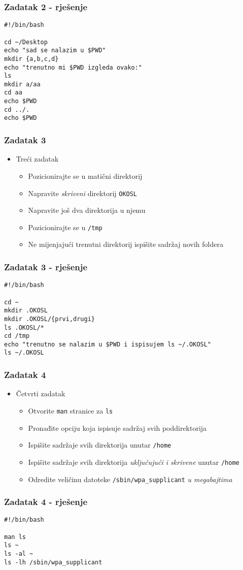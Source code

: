 \documentclass{beamer}
\newcommand{\shell}[1]{\texttt{#1}}
\begin{document}
\begin{frame}[fragile]
\frametitle{Zadatak 2 - rješenje}
    \begin{verbatim}
#!/bin/bash

cd ~/Desktop
echo "sad se nalazim u $PWD"
mkdir {a,b,c,d}
echo "trenutno mi $PWD izgleda ovako:"
ls
mkdir a/aa
cd aa
echo $PWD
cd ../.
echo $PWD
    \end{verbatim}
\end{frame}

\begin{frame}[t]
\frametitle{Zadatak 3}
\begin{itemize}
	\item Treći zadatak
	\begin{itemize}
		\item Pozicionirajte se u matični direktorij
		\item Napravite \emph{skriveni} direktorij \shell{OKOSL}
		\item Napravite još dva direktorija u njemu
		\item Pozicionirajte se u \shell{/tmp}
		\item Ne mijenjajući trenutni direktorij ispišite sadržaj novih foldera
	\end{itemize}
\end{itemize}
\end{frame}

\begin{frame}[fragile]
\frametitle{Zadatak 3 - rješenje}
    \begin{verbatim}
#!/bin/bash

cd ~
mkdir .OKOSL
mkdir .OKOSL/{prvi,drugi}
ls .OKOSL/*
cd /tmp
echo "trenutno se nalazim u $PWD i ispisujem ls ~/.OKOSL"
ls ~/.OKOSL
    \end{verbatim}
\end{frame}

\begin{frame}[t]
\frametitle{Zadatak 4}
\begin{itemize}
	\item Četvrti zadatak
	\begin{itemize}
		\item Otvorite \shell{man} stranice za \shell{ls}
		\item Pronađite opciju koja ispisuje sadržaj svih poddirektorija
		\item Ispišite sadržaje svih direktorija unutar \shell{/home}
		\item Ispišite sadržaje svih direktorija \emph{uključujući i skrivene} unutar \shell{/home}
		\item Odredite veličinu datoteke \shell{/sbin/wpa\_supplicant} \emph{u megabajtima}
	\end{itemize}
\end{itemize}
\end{frame}

\begin{frame}[fragile]
\frametitle{Zadatak 4 - rješenje}
    \begin{verbatim}
#!/bin/bash

man ls
ls ~
ls -al ~
ls -lh /sbin/wpa_supplicant
    \end{verbatim}
\end{frame}
\end{document}

